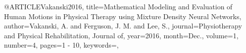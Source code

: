 @ARTICLE{Vakanski2016,
title={Mathematical Modeling and Evaluation of Human Motions in Physical Therapy using Mixture Density Neural Networks},
author={Vakanski, A. and Ferguson, J. M. and Lee, S.},
journal={Physiotherapy and Physical Rehabilitation, Journal of}, 
year={2016},
month={Dec.},
volume={1},
number={4},
pages={1 - 10},
keywords={},
}
